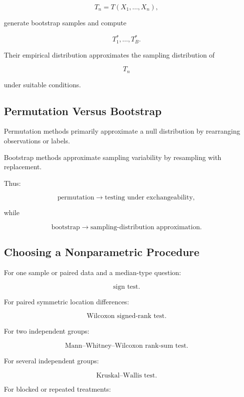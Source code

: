 \[
T_n
=
T(X_1,\ldots,X_n),
\]

generate bootstrap samples and compute

\[
T_1^*,
\ldots,
T_B^*.
\]

Their empirical distribution approximates the sampling distribution of

\[
T_n
\]

under suitable conditions.

\subsection{Permutation Versus Bootstrap}
\label{subsec:permutation-versus-bootstrap}

Permutation methods primarily approximate a null distribution by
rearranging observations or labels.

Bootstrap methods approximate sampling variability by resampling with
replacement.

Thus:

\[
\boxed{
\text{permutation}
\rightarrow
\text{testing under exchangeability},
}
\]

while

\[
\boxed{
\text{bootstrap}
\rightarrow
\text{sampling-distribution approximation}.
}
\]

\subsection{Choosing a Nonparametric Procedure}
\label{subsec:choosing-nonparametric-procedure}

For one sample or paired data and a median-type question:

\[
\boxed{
\text{sign test}.
}
\]

For paired symmetric location differences:

\[
\boxed{
\text{Wilcoxon signed-rank test}.
}
\]

For two independent groups:

\[
\boxed{
\text{Mann--Whitney--Wilcoxon rank-sum test}.
}
\]

For several independent groups:

\[
\boxed{
\text{Kruskal--Wallis test}.
}
\]

For blocked or repeated treatments:

